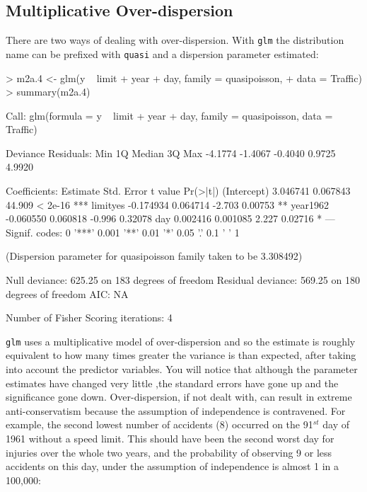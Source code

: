 \documentclass{article}
\begin{document}
\subsection{Multiplicative Over-dispersion}

There are two ways of dealing with over-dispersion. With \texttt{glm} the distribution name can be prefixed with \texttt{quasi} and a dispersion parameter estimated:

\begin{Schunk}
\begin{Sinput}
> m2a.4 <- glm(y ~ limit + year + day, family = quasipoisson, 
+     data = Traffic)
> summary(m2a.4)
\end{Sinput}
\begin{Soutput}
Call:
glm(formula = y ~ limit + year + day, family = quasipoisson, 
    data = Traffic)

Deviance Residuals: 
    Min       1Q   Median       3Q      Max  
-4.1774  -1.4067  -0.4040   0.9725   4.9920  

Coefficients:
             Estimate Std. Error t value Pr(>|t|)    
(Intercept)  3.046741   0.067843  44.909  < 2e-16 ***
limityes    -0.174934   0.064714  -2.703  0.00753 ** 
year1962    -0.060550   0.060818  -0.996  0.32078    
day          0.002416   0.001085   2.227  0.02716 *  
---
Signif. codes:  0 '***' 0.001 '**' 0.01 '*' 0.05 '.' 0.1 ' ' 1 

(Dispersion parameter for quasipoisson family taken to be 3.308492)

    Null deviance: 625.25  on 183  degrees of freedom
Residual deviance: 569.25  on 180  degrees of freedom
AIC: NA

Number of Fisher Scoring iterations: 4
\end{Soutput}
\end{Schunk}

\texttt{glm} uses a multiplicative model of over-dispersion and so the estimate is roughly equivalent to how many times greater the variance is than expected, after taking into account the predictor variables. You will notice that although the parameter estimates have changed very little ,the standard errors have gone up and the significance gone down. Over-dispersion, if not dealt with, can result in extreme anti-conservatism because the assumption of independence is contravened. For example, the second lowest number of accidents (8) occurred on the 91$^{st}$ day of 1961 without a speed limit. This should have been the second worst day for injuries over the whole two years, and the probability of observing 9 or less accidents on this day, under the assumption of independence is almost 1 in a 100,000:
\end{document}
